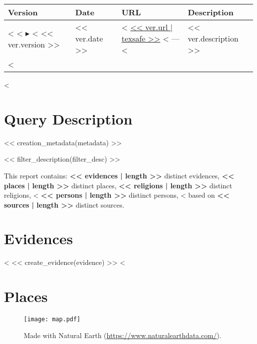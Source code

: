 \documentclass[fontsize=10pt,toc=chapterentrywithdots]{scrreprt}
\begin{document}
\begin{center}
\renewcommand{\arraystretch}{1.3}
\footnotesize
\begin{longtable}{@{}p{1cm}p{1.5cm}p{6cm}p{5.8cm}@{}}
  \textbf{Version} & \textbf{Date} & \textbf{URL} & \textbf{Description} \\
  \hline
  \endhead
    <%
      <%
      $\blacktriangleright$
      <%
      \hfill << ver.version >>
      &
      << ver.date >>
      &
      <%
      \scriptsize{\url{<< ver.url | texsafe >>}}
      <%
      ---
      <%
      &
      << ver.description >>
      \\
    <%
\end{longtable}
\end{center}
<%

\chapter{Query Description}
\label{sec:filters}

<< creation_metadata(metadata) >>

<< filter_description(filter_desc) >>

This report contains:
\textbf{<< evidences | length >>} distinct evidences,
\textbf{<< places | length >>} distinct places,
\textbf{<< religions | length >>} distinct religions,
<%
\textbf{<< persons | length >>} distinct persons,
<%
based on \textbf{<< sources | length >>} distinct sources.


\clearpage
\chapter{Evidences}
\label{sec:evidences}

<%
  << create_evidence(evidence) >>
<%


\clearpage
\chapter{Places}
\label{sec:places}

\begin{figure}[H]
  \texttt{[image: map.pdf]}
  \caption{Made with Natural Earth (\url{https://www.naturalearthdata.com/}).}
\end{figure}
\end{document}
